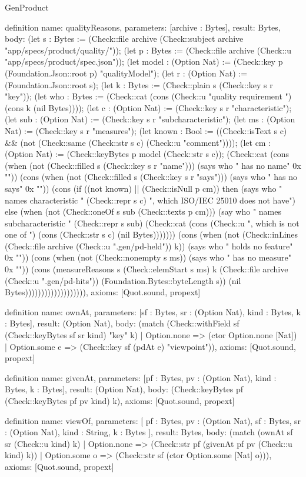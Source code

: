 \begin{lexlean}{GenProduct}
\begin{semanticmodule}
{definition{
  name: qualityReasons,
  parameters: [archive : Bytes],
  result: Bytes,
  body: (let s : Bytes := (Check::file archive (Check::subject archive "app/specs/product/quality/")); (let p : Bytes := (Check::file archive (Check::u "app/specs/product/spec.json")); (let model : (Option Nat) := (Check::key p (Foundation.Json::root p) "qualityModel"); (let r : (Option Nat) := (Foundation.Json::root s); (let k : Bytes := (Check::plain s (Check::key s r "key")); (let who : Bytes := (Check::cat (cons (Check::u "quality requirement ") (cons k (nil Bytes)))); (let c : (Option Nat) := (Check::key s r "characteristic"); (let sub : (Option Nat) := (Check::key s r "subcharacteristic"); (let ms : (Option Nat) := (Check::key s r "measures"); (let known : Bool := ((Check::isText s c) && (not (Check::same (Check::str s c) (Check::u "comment")))); (let cm : (Option Nat) := (Check::keyBytes p model (Check::str s c)); (Check::cat (cons (when (not (Check::filled s (Check::key s r "name"))) (says who " has no name" 0x "")) (cons (when (not (Check::filled s (Check::key s r "says"))) (says who " has no says" 0x "")) (cons (if ((not known) || (Check::isNull p cm)) then (says who " names characteristic " (Check::repr s c) ", which ISO/IEC 25010 does not have") else (when (not (Check::oneOf s sub (Check::texts p cm))) (say who " names subcharacteristic " (Check::repr s sub) (Check::cat (cons (Check::u ", which is not one of ") (cons (Check::str s c) (nil Bytes))))))) (cons (when (not (Check::inLines (Check::file archive (Check::u ".gen/pd-held")) k)) (says who " holds no feature" 0x "")) (cons (when (not (Check::nonempty s ms)) (says who " has no measure" 0x "")) (cons (measureReasons s (Check::elemStart s ms) k (Check::file archive (Check::u ".gen/pd-hits")) (Foundation.Bytes::byteLength s)) (nil Bytes))))))))))))))))))),
  axioms: [Quot.sound, propext]
}

definition{
  name: ownAt,
  parameters: [sf : Bytes, sr : (Option Nat), kind : Bytes, k : Bytes],
  result: (Option Nat),
  body: (match (Check::withField sf (Check::keyBytes sf sr kind) "key" k)
    | Option.none => (ctor Option.none [Nat])
    | Option.some e => (Check::key sf (pdAt e) "viewpoint")),
  axioms: [Quot.sound, propext]
}

definition{
  name: givenAt,
  parameters: [pf : Bytes, pv : (Option Nat), kind : Bytes, k : Bytes],
  result: (Option Nat),
  body: (Check::keyBytes pf (Check::keyBytes pf pv kind) k),
  axioms: [Quot.sound, propext]
}

definition{
  name: viewOf,
  parameters: [
    pf : Bytes,
    pv : (Option Nat),
    sf : Bytes,
    sr : (Option Nat),
    kind : String,
    k : Bytes
  ],
  result: Bytes,
  body: (match (ownAt sf sr (Check::u kind) k)
    | Option.none => (Check::str pf (givenAt pf pv (Check::u kind) k))
    | Option.some o => (Check::str sf (ctor Option.some [Nat] o))),
  axioms: [Quot.sound, propext]
}

}
\end{semanticmodule}
\end{lexlean}
